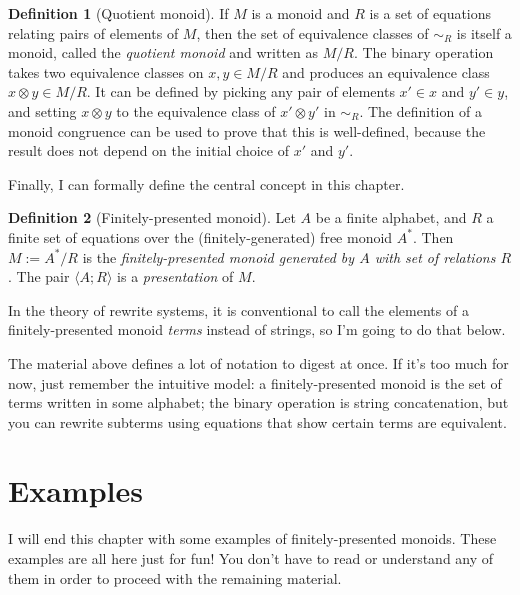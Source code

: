 \documentclass[headsepline,bibliography=totoc]{scrreport}
\theoremstyle{definition}
\theoremstyle{definition}
\newtheorem{definition}{Definition}[chapter]
\theoremstyle{definition}
\begin{document}

\begin{definition}[Quotient monoid] If $M$ is a monoid and $R$ is a set of equations relating pairs of elements of $M$, then the set of equivalence classes of $\sim_R$ is itself a monoid, called the \emph{quotient monoid} and written as $M/R$. The binary operation takes two equivalence classes on $x, y\in M/R$ and produces an equivalence class $x\otimes y\in M/R$. It can be defined by picking any pair of elements $x'\in x$ and $y'\in y$, and setting $x\otimes y$ to the equivalence class of $x'\otimes y'$ in $\sim_R$. The definition of a monoid congruence can be used to prove that this is well-defined, because the result does not depend on the initial choice of $x'$ and $y'$.
\end{definition}

Finally, I can formally define the central concept in this chapter.

\begin{definition}[Finitely-presented monoid] Let $A$ be a finite alphabet, and $R$ a finite set of equations over the (finitely-generated) free monoid $A^*$. Then $M:=A^*/R$ is the \emph{finitely-presented monoid generated by $A$ with set of relations $R$}. The pair $\langle A;R\rangle$ is a \emph{presentation} of $M$.
\end{definition}

In the theory of rewrite systems, it is conventional to call the elements of a finitely-presented monoid \emph{terms} instead of strings, so I'm going to do that below.

The material above defines a lot of notation to digest at once. If it's too much for now, just remember the intuitive model: a finitely-presented monoid is the set of terms written in some alphabet; the binary operation is string concatenation, but you can rewrite subterms using equations that show certain terms are equivalent.

\section{Examples}
I will end this chapter with some examples of finitely-presented monoids. These examples are all here just for fun! You don't have to read or understand any of them in order to proceed with the remaining material.
\end{document}
